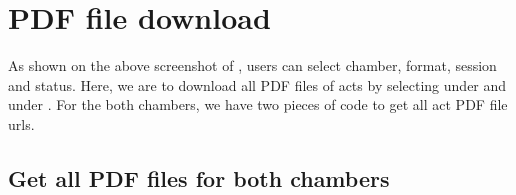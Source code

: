 \documentclass[letterpaper,10pt,english]{jupyterBook}
\begin{document}
\section{PDF file download}
\label{\detokenize{ch39:pdf-file-download}}
\sphinxAtStartPar
As shown on the above screenshot of , users can select chamber, format, session and status. Here, we are to download all PDF files of acts by selecting  under  and  under . For the both chambers, we have two pieces of code to get all act PDF file urls.


\subsection{Get all PDF files for both chambers}
\label{\detokenize{ch39:get-all-pdf-files-for-both-chambers}}
\end{document}
